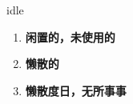
\begin{frame}
{\huge idle}
\begin{center}
\begin{enumerate}\Large
  \item \textbf{闲置的，未使用的}
  \item \textbf{懒散的}
  \item \textbf{懒散度日，无所事事}
\end{enumerate}
\end{center}
\end{frame}
